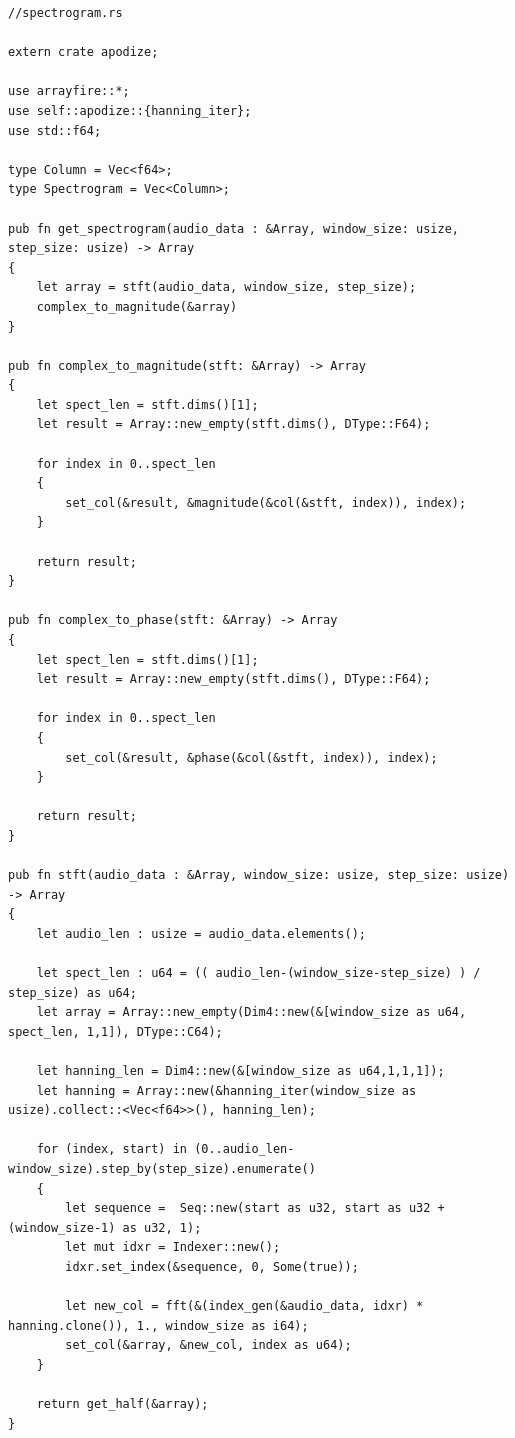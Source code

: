 \documentclass[a4paper,12pt]{report}
\begin{document}
\begin{verbatim}
//spectrogram.rs

extern crate apodize;

use arrayfire::*;
use self::apodize::{hanning_iter};
use std::f64;

type Column = Vec<f64>;
type Spectrogram = Vec<Column>;

pub fn get_spectrogram(audio_data : &Array, window_size: usize, step_size: usize) -> Array
{
    let array = stft(audio_data, window_size, step_size);
    complex_to_magnitude(&array)
}

pub fn complex_to_magnitude(stft: &Array) -> Array
{
    let spect_len = stft.dims()[1];
    let result = Array::new_empty(stft.dims(), DType::F64);

    for index in 0..spect_len
    {
        set_col(&result, &magnitude(&col(&stft, index)), index);
    }

    return result;
}

pub fn complex_to_phase(stft: &Array) -> Array
{
    let spect_len = stft.dims()[1];
    let result = Array::new_empty(stft.dims(), DType::F64);    

    for index in 0..spect_len
    {
        set_col(&result, &phase(&col(&stft, index)), index);
    }

    return result;
}

pub fn stft(audio_data : &Array, window_size: usize, step_size: usize) -> Array
{
    let audio_len : usize = audio_data.elements();

    let spect_len : u64 = (( audio_len-(window_size-step_size) ) / step_size) as u64;
    let array = Array::new_empty(Dim4::new(&[window_size as u64, spect_len, 1,1]), DType::C64);

    let hanning_len = Dim4::new(&[window_size as u64,1,1,1]);
    let hanning = Array::new(&hanning_iter(window_size as usize).collect::<Vec<f64>>(), hanning_len);

    for (index, start) in (0..audio_len-window_size).step_by(step_size).enumerate()
    {
        let sequence =  Seq::new(start as u32, start as u32 + (window_size-1) as u32, 1);
        let mut idxr = Indexer::new();                
        idxr.set_index(&sequence, 0, Some(true));

        let new_col = fft(&(index_gen(&audio_data, idxr) * hanning.clone()), 1., window_size as i64);
        set_col(&array, &new_col, index as u64); 
    }

    return get_half(&array);
}


\end{verbatim}
\end{document}
